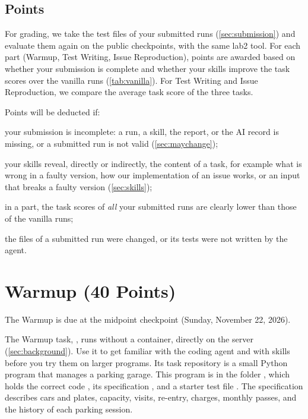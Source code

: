 \documentclass[letterpaper,11pt]{article}
\begin{document}
\subsection{Points}
\label{sec:points}

For grading, we take the test files of your submitted runs
(\autoref{sec:submission}) and evaluate them again on the public checkpoints,
with the same lab2 tool. For each part (Warmup, Test Writing, Issue
Reproduction), points are awarded based on whether your submission is
complete and whether your skills improve the task scores over the vanilla
runs (\autoref{tab:vanilla}). For Test Writing and Issue Reproduction, we
compare the average task score of the three tasks.

Points will be deducted if:
\squishlist
 \item your submission is incomplete: a run, a skill, the report, or the AI
   record is
   missing, or a submitted run is not valid (\autoref{sec:maychange});
 \item your skills reveal, directly or indirectly, the content of a task, for example what is wrong in a faulty version, how our implementation of an
   issue works, or an input that breaks a faulty version (\autoref{sec:skills});
 \item in a part, the task scores of \emph{all} your submitted runs are clearly
   lower than those of the vanilla runs;
 \item the files of a submitted run were changed, or its tests were not
   written by the agent.
\squishend

\section{Warmup (40 Points)}
\label{sec:warmup}

The Warmup is due at the midpoint checkpoint (Sunday, November 22, 2026).

The Warmup task, , runs without a container, directly on the
server (\autoref{sec:background}). Use it to get familiar with the coding
agent and with skills before you try them on larger programs. Its task
repository is a small Python program that manages a parking garage. This
program is in the folder , which holds the
correct code , its specification , and a starter test file
. The specification describes cars and plates, capacity,
visits, re-entry, charges, monthly passes, and the history of each parking
session.
\end{document}
